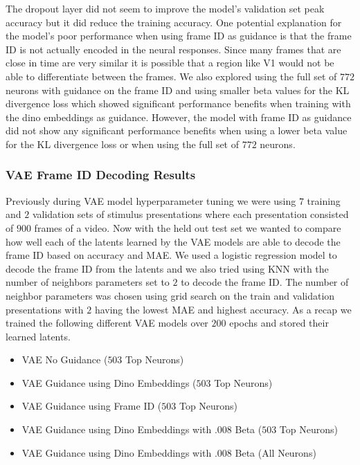 \documentclass[12pt, letterpaper]{article}
\begin{document}
The dropout layer did not seem to improve the model's validation set peak accuracy but it did reduce the training accuracy. One potential explanation for the model's poor performance when using frame ID as guidance is that the frame ID is not actually encoded in the neural responses. Since many frames that are close in time are very similar it is possible that a region like V1 would not be able to differentiate between the frames. We also explored using the full set of $772$ neurons with guidance on the frame ID and using smaller beta values for the KL divergence loss which showed significant performance benefits when training with the dino embeddings as guidance. However, the model with frame ID as guidance did not show any significant performance benefits when using a lower beta value for the KL divergence loss or when using the full set of $772$ neurons.

\subsubsection{VAE Frame ID Decoding Results}
\label{subsubsec:vae_frame_id_decoding}
Previously during VAE model hyperparameter tuning we were using $7$ training and $2$ validation sets of stimulus presentations where each presentation consisted of $900$ frames of a video. Now with the held out test set we wanted to compare how well each of the latents learned by the VAE models are able to decode the frame ID based on accuracy and MAE. We used a logistic regression model to decode the frame ID from the latents and we also tried using KNN with the number of neighbors parameters set to $2$ to decode the frame ID. The number of neighbor parameters was chosen using grid search on the train and validation presentations with $2$ having the lowest MAE and highest accuracy. As a recap we trained the following different VAE models over $200$ epochs and stored their learned latents.

\begin{itemize}
    \item VAE No Guidance ($503$ Top Neurons)
    \item VAE Guidance using Dino Embeddings ($503$ Top Neurons)
    \item VAE Guidance using Frame ID ($503$ Top Neurons)
    \item VAE Guidance using Dino Embeddings with .008 Beta ($503$ Top Neurons)
    \item VAE Guidance using Dino Embeddings with .008 Beta (All Neurons)
\end{itemize}
\end{document}
